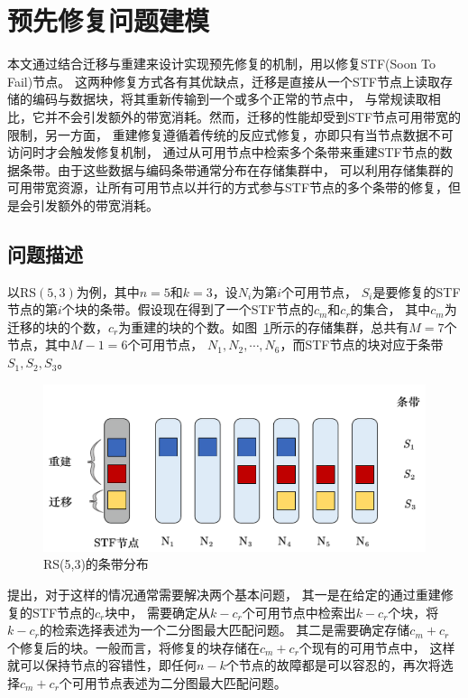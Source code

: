 \section{预先修复问题建模}
本文通过结合迁移与重建来设计实现预先修复的机制，用以修复STF(Soon To Fail)\cite{shen2019fast}节点。
这两种修复方式各有其优缺点，迁移是直接从一个STF节点上读取存储的编码与数据块，将其重新传输到一个或多个正常的节点中，
与常规读取相比，它并不会引发额外的带宽消耗。然而，迁移的性能却受到STF节点可用带宽的限制，另一方面，
重建修复遵循着传统的反应式修复，亦即只有当节点数据不可访问时才会触发修复机制，
通过从可用节点中检索多个条带来重建STF节点的数据条带。由于这些数据与编码条带通常分布在存储集群中，
可以利用存储集群的可用带宽资源，让所有可用节点以并行的方式参与STF节点的多个条带的修复，但是会引发额外的带宽消耗。

\subsection{问题描述}

以RS$(5,3)$为例，其中$n=5$和$k=3$，设$N_i$为第$i$个可用节点，
$S_i$是要修复的STF节点的第$i$个块的条带。假设现在得到了一个STF节点的$c_m$和$c_r$的集合，
其中$c_m$为迁移的块的个数，$c_r$为重建的块的个数。如图~\ref{fig:3.2}所示的存储集群，总共有$M=7$个节点，其中$M-1=6$个可用节点，
$N_1,N_2,\cdots,N_6$，而STF节点的块对应于条带$S_1,S_2,S_3$。


\begin{figure}[htbp]
	\centering
	\includegraphics [scale=0.5]{figures/3.2.pdf}
	\caption{RS(5,3)的条带分布}
	\label{fig:3.2}
\end{figure}

\citet{shen2019fast}提出，对于这样的情况通常需要解决两个基本问题，
其一是在给定的通过重建修复的STF节点的$c_r$块中，
需要确定从$k-c_r$个可用节点中检索出$k-c_r$个块，将$k-c_r$的检索选择表述为一个二分图最大匹配问题。
其二是需要确定存储$c_m+c_r$个修复后的块。一般而言，将修复的块存储在$c_m+c_r$个现有的可用节点中，
这样就可以保持节点的容错性，即任何$n-k$个节点的故障都是可以容忍的，再次将选择$c_m+c_r$个可用节点表述为二分图最大匹配问题。

